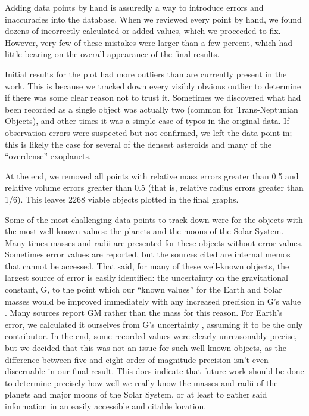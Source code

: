 \documentclass[twocolumn,linenumbers]{aastex631}
\begin{document}
Adding data points by hand is assuredly a way to introduce errors and inaccuracies into the database. When we reviewed every point by hand, we found dozens of incorrectly calculated or added values, which we proceeded to fix. However, very few of these mistakes were larger than a few percent, which had little bearing on the overall appearance of the final results. 

Initial results for the plot had more outliers than are currently present in the work. This is because we tracked down every visibly obvious outlier to determine if there was some clear reason not to trust it. Sometimes we discovered what had been recorded as a single object was actually two (common for Trans-Neptunian Objects), and other times it was a simple case of typos in the original data. If observation errors were suspected but not confirmed, we left the data point in; this is likely the case for several of the densest asteroids and many of the ``overdense'' exoplanets.  

At the end, we removed all points with relative mass errors greater than 0.5 and relative volume errors greater than 0.5 (that is, relative radius errors greater than 1/6). This leaves 2268 viable objects plotted in the final graphs.

Some of the most challenging data points to track down were for the objects with the most well-known values: the planets and the moons of the Solar System. Many times masses and radii are presented for these objects without error values. Sometimes error values are reported, but the sources cited are internal memos that cannot be accessed. That said, for many of these well-known objects, the largest source of error is easily identified: the uncertainty on the gravitational constant, G, to the point which our ``known values'' for the Earth and Solar masses would be improved immediately with any increased precision in G's value \citep{Gillies1997}. Many sources report GM rather than the mass for this reason. For Earth's error, we calculated it ourselves from G's uncertainty \citep{NIST_G}, assuming it to be the only contributor. In the end, some recorded values were clearly unreasonably precise, but we decided that this was not an issue for such well-known objects, as the difference between five and eight order-of-magnitude precision isn't even discernable in our final result. This does indicate that future work should be done to determine precisely how well we really know the masses and radii of the planets and major moons of the Solar System, or at least to gather said information in an easily accessible and citable location.
\end{document}

